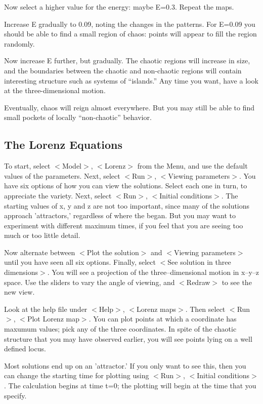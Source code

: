    Now select a higher value for the energy: maybe E=0.3. Repeat the maps.

   Increase E gradually to 0.09, noting the changes in the patterns.
For E=0.09 you should be able to find a small region of chaos: points
will appear to fill the region randomly.

   Now increase E further, but gradually. The chaotic regions will increase
in size, and the boundaries between the chaotic and non-chaotic regions
will contain interesting structure such as systems of ``islands.'' Any time
you want, have a look at the three-dimensional motion.

   Eventually, chaos will reign almost everywhere. But you may still be
able to find small pockets of locally ``non-chaotic'' behavior.


\subsection{The Lorenz Equations}

   To start, select $<$Model$>$, $<$Lorenz$>$ from the Menu, and use the default
values of the parameters. Next, select $<$Run$>$, $<$Viewing parameters$>$. You
have six options of how you can view the solutions. Select each one in turn,
to appreciate the variety. Next, select $<$Run$>$, $<$Initial conditions$>$. The
starting values of x, y and z are not too important, since many of the
solutions approach 'attractors,' regardless of where the began. But you
may want to experiment with different maximum times, if you feel that you
are seeing too much or too little detail.

   Now alternate between $<$Plot the solution$>$ and $<$Viewing parameters$>$
until you have seen all six options. Finally, select $<$See solution in
three dimensions$>$. You will see a projection of the three--dimensional
motion in x--y--z space. Use the sliders to vary the angle of viewing, and
$<$Redraw$>$ to see the new view.

   Look at the help file under $<$Help$>$, $<$Lorenz maps$>$. Then select $<$Run$>$,
$<$Plot Lorenz map$>$. You can plot points at which a coordinate has maxumum
values; pick any of the three coordinates. In spite of the chaotic structure
that you may have observed earlier, you will see points lying on a well
defined locus.

   Most solutions end up on an 'attractor.' If you only want to see this,
then you can change the starting time for plotting using $<$Run$>$, $<$Initial
conditions$>$. The calculation begins at time t=0; the plotting will begin
at the time that you specify.

